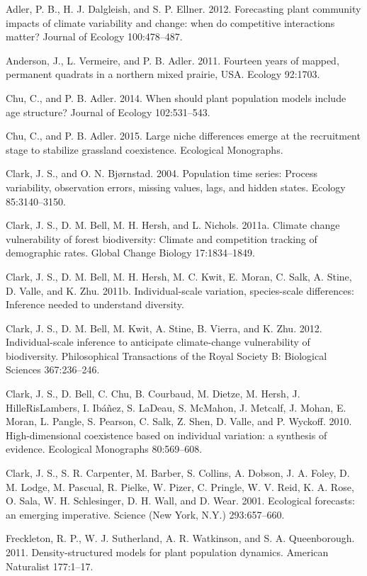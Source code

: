 \documentclass[12pt,]{article}
\begin{document}
Adler, P. B., H. J. Dalgleish, and S. P. Ellner. 2012. Forecasting plant
community impacts of climate variability and change: when do competitive
interactions matter? Journal of Ecology 100:478--487.

Anderson, J., L. Vermeire, and P. B. Adler. 2011. Fourteen years of
mapped, permanent quadrats in a northern mixed prairie, USA. Ecology
92:1703.

Chu, C., and P. B. Adler. 2014. When should plant population models
include age structure? Journal of Ecology 102:531--543.

Chu, C., and P. B. Adler. 2015. Large niche differences emerge at the
recruitment stage to stabilize grassland coexistence. Ecological
Monographs.

Clark, J. S., and O. N. Bjørnstad. 2004. Population time series: Process
variability, observation errors, missing values, lags, and hidden
states. Ecology 85:3140--3150.

Clark, J. S., D. M. Bell, M. H. Hersh, and L. Nichols. 2011a. Climate
change vulnerability of forest biodiversity: Climate and competition
tracking of demographic rates. Global Change Biology 17:1834--1849.

Clark, J. S., D. M. Bell, M. H. Hersh, M. C. Kwit, E. Moran, C. Salk, A.
Stine, D. Valle, and K. Zhu. 2011b. Individual-scale variation,
species-scale differences: Inference needed to understand diversity.

Clark, J. S., D. M. Bell, M. Kwit, A. Stine, B. Vierra, and K. Zhu.
2012. Individual-scale inference to anticipate climate-change
vulnerability of biodiversity. Philosophical Transactions of the Royal
Society B: Biological Sciences 367:236--246.

Clark, J. S., D. Bell, C. Chu, B. Courbaud, M. Dietze, M. Hersh, J.
HilleRisLambers, I. Ibáñez, S. LaDeau, S. McMahon, J. Metcalf, J. Mohan,
E. Moran, L. Pangle, S. Pearson, C. Salk, Z. Shen, D. Valle, and P.
Wyckoff. 2010. High-dimensional coexistence based on individual
variation: a synthesis of evidence. Ecological Monographs 80:569--608.

Clark, J. S., S. R. Carpenter, M. Barber, S. Collins, A. Dobson, J. A.
Foley, D. M. Lodge, M. Pascual, R. Pielke, W. Pizer, C. Pringle, W. V.
Reid, K. A. Rose, O. Sala, W. H. Schlesinger, D. H. Wall, and D. Wear.
2001. Ecological forecasts: an emerging imperative. Science (New York,
N.Y.) 293:657--660.

Freckleton, R. P., W. J. Sutherland, A. R. Watkinson, and S. A.
Queenborough. 2011. Density-structured models for plant population
dynamics. American Naturalist 177:1--17.
\end{document}
